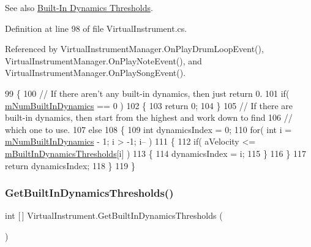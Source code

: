 \begin{DoxySeeAlso}{See also}
\hyperlink{group___audio_DefBIDThresh}{Built-\/\+In Dynamics Thresholds}. 
\end{DoxySeeAlso}


Definition at line 98 of file Virtual\+Instrument.\+cs.



Referenced by Virtual\+Instrument\+Manager.\+On\+Play\+Drum\+Loop\+Event(), Virtual\+Instrument\+Manager.\+On\+Play\+Note\+Event(), and Virtual\+Instrument\+Manager.\+On\+Play\+Song\+Event().


\begin{DoxyCode}
99     \{
100         \textcolor{comment}{// If there aren't any built-in dynamics, then just return 0.}
101         \textcolor{keywordflow}{if}( \hyperlink{group___v_i_base_pro_var_gac265f64f759d267ee1e1680f8d387011}{mNumBuiltInDynamics} == 0 )
102         \{
103             \textcolor{keywordflow}{return} 0;
104         \}
105         \textcolor{comment}{// If there are built-in dynamics, then start from the highest and work down to find}
106         \textcolor{comment}{// which one to use. }
107         \textcolor{keywordflow}{else}
108         \{
109             \textcolor{keywordtype}{int} dynamicsIndex = 0;
110             \textcolor{keywordflow}{for}( \textcolor{keywordtype}{int} i = \hyperlink{group___v_i_base_pro_var_gac265f64f759d267ee1e1680f8d387011}{mNumBuiltInDynamics} - 1; i > -1; i-- )
111             \{
112                 \textcolor{keywordflow}{if}( aVelocity <= \hyperlink{group___v_i_base_pro_var_gae3db4264dc2a96e99ea680c6d637e6bf}{mBuiltInDynamicsThresholds}[i] )
113                 \{
114                     dynamicsIndex = i;
115                 \}
116             \}
117             \textcolor{keywordflow}{return} dynamicsIndex;
118         \}
119     \}
\end{DoxyCode}
\mbox{\label{group___v_i_base_pub_func_gac8fc20c49c1b97b6787ed1b3e0073a7f}} 
\subsubsection{\texorpdfstring{Get\+Built\+In\+Dynamics\+Thresholds()}{GetBuiltInDynamicsThresholds()}}
{\footnotesize\ttfamily int \mbox{[}$\,$\mbox{]} Virtual\+Instrument.\+Get\+Built\+In\+Dynamics\+Thresholds (\begin{DoxyParamCaption}{ }\end{DoxyParamCaption})}



